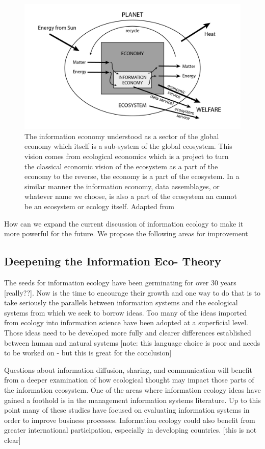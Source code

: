 \begin{figure}[!ht]
  \centering
    \includegraphics[width=5.5in]{figures/ecologicalecon}
  \caption{The information economy understood as a sector of the global economy which itself is a sub-system of the global ecosystem. This vision comes from ecological economics which is a project to turn the classical economic vision of the ecosystem as a part of the economy to the reverse, the economy is a part of the ecosystem. In a similar manner the information economy, data assemblages, or whatever name we choose, is also a part of the ecosystem an cannot be an ecosystem or ecology itself. Adapted from \citep[][p. 18]{daly_2004}}
\end{figure}

How can we expand the current discussion of information ecology to make it more powerful for the future. We propose the following areas for improvement

\subsection{Deepening the Information Eco- Theory}

The seeds for information ecology have been germinating for over 30 years [really??]. Now is the time to encourage their growth and one way to do that is to take seriously the parallels between information systems and the ecological systems from which we seek to borrow ideas. Too many of the ideas imported from ecology into information science have been adopted at a superficial level. Those ideas need to be developed more fully and clearer differences established between human and natural systems [note: this language choice is poor and needs to be worked on - but this is great for the conclusion]

Questions about information diffusion, sharing, and communication will benefit from a deeper examination of how ecological thought may impact those parts of the information ecosystem. One of the areas where information ecology ideas have gained a foothold is in the management information systems literature. Up to this point many of these studies have focused on evaluating information systems in order to improve business processes. Information ecology could also benefit from greater international participation, especially in developing countries. \citep{wang_information_2015} [this is not clear]

